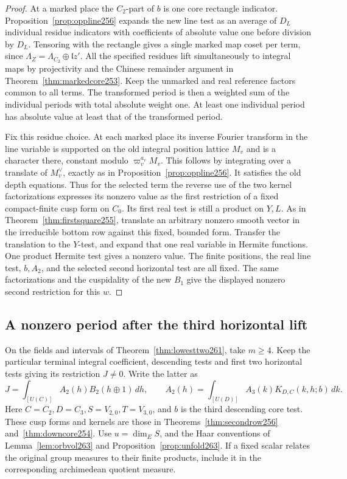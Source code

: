 \documentclass[a4paper,11pt]{article}
\theoremstyle{definition}
\theoremstyle{remark}
\numberwithin{equation}{section}
\begin{document}
\begin{proof}
At a marked place the \(C_2\)-part of \(b\) is one core
rectangle indicator. Proposition~\ref{prop:oppline256}
expands the new line test as an average of \(D_L\) individual
residue indicators with coefficients of absolute value one
before division by \(D_L\). Tensoring with the rectangle gives
a single marked map coset per term, since
\(\Lambda_Z=\Lambda_{C_2}\oplus\mathfrak l z'\). All the
specified residues lift simultaneously to integral maps by
projectivity and the Chinese remainder argument in
Theorem~\ref{thm:markedcore253}. Keep the unmarked and real
reference factors common to all terms. The transformed period
is then a weighted sum of the individual periods with total
absolute weight one. At least one individual period has
absolute value at least that of the transformed period.

Fix this residue choice. At each marked place its inverse
Fourier transform in the line variable is supported on the
old integral position lattice \(M_v\) and is a character
there, constant modulo \(\varpi_v^{a_v}M_v\). This follows
by integrating over a translate of \(M_v^\vee\), exactly as
in Proposition~\ref{prop:oppline256}. It satisfies the old
depth equations. Thus for the selected term the reverse use
of the two kernel factorizations expresses its nonzero value
as the first restriction of a fixed compact-finite cusp form
on \(C_0\). Its first real test is still a product on \(Y,L\).
As in Theorem~\ref{thm:firstsquare255}, translate an arbitrary
nonzero smooth vector in the irreducible bottom row against
this fixed, bounded form. Transfer the translation to the
\(Y\)-test, and expand that one real variable in Hermite
functions. One product Hermite test gives a nonzero value.
The finite positions, the real line test, \(b,A_2\), and the
selected second horizontal test are all fixed. The same
factorizations and the cuspidality of the new \(B_1\) give
the displayed nonzero second restriction for this \(w\).
\end{proof}

\subsection{A nonzero period after the third horizontal lift}\label{nav:IV-38}
On the fields and intervals of Theorem~\ref{thm:lowesttwo261},
take \(m\ge4\). Keep the particular terminal integral coefficient,
descending tests and first two horizontal tests giving its
restriction \(J\ne0\). Write the latter as
\[
       J=\int_{[U(C)]}A_2(h)B_2(h\oplus1)\,dh,\qquad
       A_2(h)=\int_{[U(D)]}A_3(k)K_{D,C}(k,h;b)\,dk .
\]
Here \(C=C_2,D=C_3,S=V_{2,0},T=V_{3,0}\), and \(b\) is the
third descending core test. These cusp forms and kernels are
those in Theorems~\ref{thm:secondrow256} and~\ref{thm:downcore254}.
Use \(u=\dim_E S\), and the Haar conventions of
Lemma~\ref{lem:orbvol263} and Proposition~\ref{prop:unfold263}.
If a fixed scalar relates the original group measures to their
finite products, include it in the corresponding archimedean
quotient measure.
\end{document}

